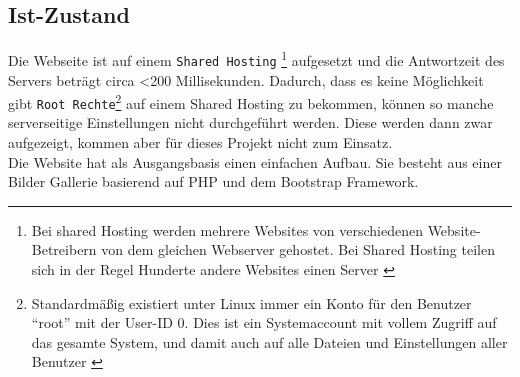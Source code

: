 	\subsection{Ist-Zustand} %
	\label{sub:ist_zustand}
		Die Webseite ist auf einem \texttt{Shared Hosting}
		\footnote{Bei shared Hosting werden mehrere Websites von verschiedenen Website-Betreibern von dem gleichen Webserver gehostet. Bei Shared Hosting teilen sich in der Regel Hunderte andere Websites einen Server \autocite{itWissen}} 
		aufgesetzt und die Antwortzeit des Servers beträgt circa <200 Millisekunden. Dadurch, dass es keine Möglichkeit gibt \texttt{Root Rechte}\footnote{Standardmäßig existiert unter Linux immer ein Konto für den Benutzer "`root"' mit der User-ID 0. Dies ist ein Systemaccount mit vollem Zugriff auf das gesamte System, und damit auch auf alle Dateien und Einstellungen aller Benutzer \autocite{ubuntu14}} auf einem Shared Hosting zu bekommen, können so manche serverseitige Einstellungen nicht durchgeführt werden. Diese werden dann zwar aufgezeigt, kommen aber für dieses Projekt nicht zum Einsatz.\\
		Die Website hat als Ausgangsbasis einen einfachen Aufbau. Sie besteht aus einer Bilder Gallerie basierend auf PHP und dem Bootstrap Framework.



\pagebreak
%
%
